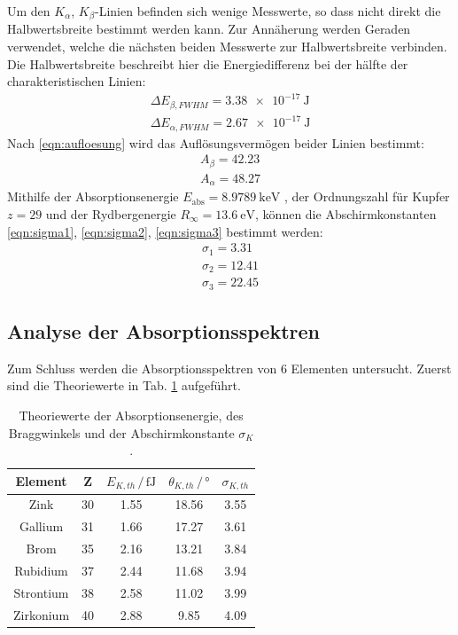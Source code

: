 Um den $K_\alpha$, $K_\beta$-Linien befinden sich wenige Messwerte, so dass nicht direkt die Halbwertsbreite bestimmt werden kann.
Zur Annäherung werden Geraden verwendet, welche die nächsten beiden Messwerte zur Halbwertsbreite verbinden.
Die Halbwertsbreite beschreibt hier die Energiedifferenz bei der hälfte der charakteristischen Linien:
\begin{align*}
    \Delta E_{\beta, FWHM} = \SI{3.38e-17}{\joule} \\
    \Delta E_{\alpha, FWHM} = \SI{2.67e-17}{\joule}
\end{align*}
Nach \eqref{eqn:aufloesung} wird das Auflösungsvermögen beider Linien bestimmt:
\begin{align}
    A_\beta = 42.23 \\
    A_\alpha = 48.27
    \label{eqn:erg_A}
\end{align}
Mithilfe der Absorptionsenergie $E_\text{abs} = \SI{8.9789}{\kilo\electronvolt}$ \cite{k_kante}, der Ordnungszahl für Kupfer $z = 29$ und der Rydbergenergie $R_\infty = \SI{13.6}{\electronvolt}$, können die Abschirmkonstanten \eqref{eqn:sigma1}, \eqref{eqn:sigma2}, \eqref{eqn:sigma3} bestimmt werden:
\begin{align}
    \sigma_1 = 3.31 \\
    \sigma_2 = 12.41 \\
    \sigma_3 = 22.45
    \label{eqn:erg_abschirm}
\end{align}

\subsection{Analyse der Absorptionsspektren}
\label{sec:absorption}
Zum Schluss werden die Absorptionsspektren von 6 Elementen untersucht.
Zuerst sind die Theoriewerte \cite{k_kante} in Tab. \ref{tab:theorie} aufgeführt.
\begin{table}
    \centering
    \begin{tabular}{c|cccc}
    \toprule
    Element & Z & $E_{K, th} \,/\, \si{\femto\joule}$ & $\theta_{K, th} \,/\, \si{\degree}$ & $\sigma_{K, th}$ \\
    \midrule
    Zink & 30 & 1.55 & 18.56 & 3.55 \\
    Gallium & 31 & 1.66 & 17.27 & 3.61 \\
    Brom & 35 & 2.16 & 13.21 & 3.84 \\
    Rubidium & 37 & 2.44 & 11.68 & 3.94 \\
    Strontium & 38 & 2.58 & 11.02 & 3.99 \\
    Zirkonium & 40 & 2.88 & 9.85 & 4.09 \\
    \bottomrule
    \end{tabular}
    \caption{Theoriewerte der Absorptionsenergie, des Braggwinkels und der Abschirmkonstante $\sigma_K$. \cite{k_kante}}
    \label{tab:theorie}
\end{table}
\FloatBarrier

